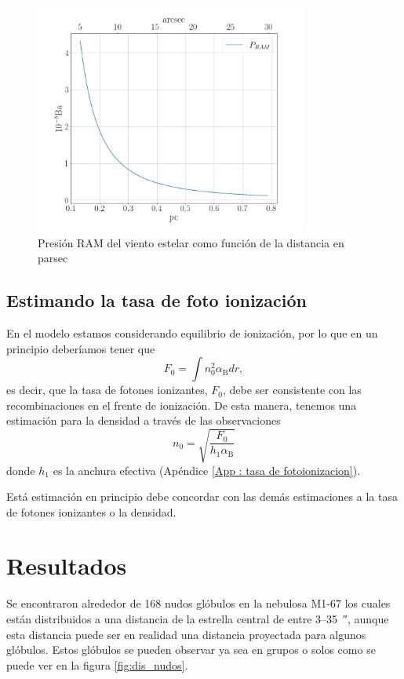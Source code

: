 \documentclass{book}
\begin{document}
\begin{figure}[h]
    \centering
    \includegraphics[width=0.8\textwidth]{images Chapter 3/C3_PRAM.png}
    \caption{Presión RAM del viento estelar como función de la distancia en parsec}
    \label{P_RAM}
\end{figure}

\section{Estimando la tasa de foto ionización}

En el modelo estamos considerando equilibrio de ionización, por lo que en un principio deberíamos tener que 
\[F_0=\int n_0^2\alpha_\mathrm{B} dr,\] es decir, que la tasa de fotones ionizantes, $F_0$, debe ser consistente con las recombinaciones en el frente de ionización. De esta manera, tenemos una estimación para la densidad a través de las observaciones
\[n_0 = \sqrt{\frac{F_0}{h_1\alpha_\mathrm{B}}}\] donde $h_1$ es la anchura efectiva (Apéndice \ref{App : tasa de fotoionizacion}). 

Está estimación en principio debe concordar con las demás estimaciones a la tasa de fotones ionizantes o la densidad.

\chapter{Resultados}

Se encontraron alrededor de 168 nudos glóbulos en la nebulosa M1-67 los cuales están distribuidos a una distancia de la estrella central de entre 3--\SI{35}{\arcsecond}, aunque esta distancia puede ser en realidad una distancia proyectada para algunos glóbulos.  Estos glóbulos se pueden observar ya sea en grupos o solos como se puede ver en la figura \ref{fig:dis_nudos}. 
\end{document}
